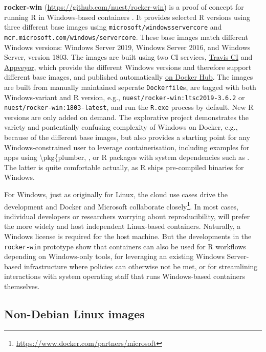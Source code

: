 \textbf{rocker-win} (\url{https://github.com/nuest/rocker-win}) is a
proof of concept for running R in Windows-based containers
\citep{nust_rocker-win_2019}. It provides selected R versions using
three different base images using \texttt{microsoft/windowsservercore}
and \texttt{mcr.microsoft.com/windows/servercore}. These base images
match different Windows versions: Windows Server 2019, Windows Server
2016, and Windows Server, version 1803. The images are built using two
CI services,
\href{https://docs.travis-ci.com/user/reference/windows/}{Travis CI} and
\href{https://www.appveyor.com/docs/windows-images-software/}{Appveyor},
which provide the different Windows versions and therefore support
different base images, and published automatically
\href{https://hub.docker.com/r/nuest/rocker-win}{on Docker Hub}. The
images are built from manually maintained seperate \texttt{Dockerfile}s,
are tagged with both Windows-variant and R version, e.g.,
\texttt{nuest/rocker-win:ltsc2019-3.6.2} or
\texttt{nuest/rocker-win:1803-latest}, and run the \texttt{R.exe}
process by default. New R versions are only added on demand. The
explorative project demonstrates the variety and pontentially confusing
complexity of Windows on Docker, e.g., because of the different base
images, but also provides a starting point for any Windows-constrained
user to leverage containerisation, including examples for apps using
\textbackslash{}pkg\{plumber, , or R packages with system
dependencies such as . The latter is quite comfortable actually,
as R ships pre-compiled binaries for Windows.

For Windows, just as originally for Linux, the cloud use cases drive the
development and Docker and Microsoft collaborate
closely\footnote{\href{https://www.docker.com/partners/microsoft}{https://www.docker.com/partners/microsoft}}.
In most cases, individual developers or researchers worrying about
reproducibility, will prefer the more widely and host independent
Linux-based containers. Naturally, a Windows license is required for the
host machine. But the developments in the \texttt{rocker-win} prototype
show that containers can also be used for R workflows depending on
Windows-only tools, for leveraging an existing Windows Server-based
infrastructure where policies can otherwise not be met, or for
streamlining interactions with system operating staff that runs
Windows-based containers themselves.

\hypertarget{non-debian-linux-images}{%
\subsection{Non-Debian Linux images}\label{non-debian-linux-images}}

